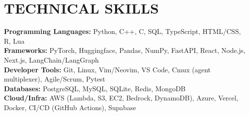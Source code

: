 \documentclass[letterpaper,11pt]{article}
\begin{document}
\section{\textbf{TECHNICAL SKILLS}}
 \begin{itemize}[leftmargin=0.15in, label={}, itemsep=-3pt, topsep=0pt]
    \small{\item{
     \textbf{Programming Languages:}{ Python, C++, C, SQL, TypeScript, HTML/CSS, R, Lua} \\
     \textbf{Frameworks:}{ PyTorch, Huggingface, Pandas, NumPy, FastAPI, React, Node.js, Next.js, LangChain/LangGraph} \\
     \textbf{Developer Tools:}{ Git, Linux, Vim/Neovim, VS Code, Cmux (agent multiplexer), Agile/Scrum, Pytest} \\
     \textbf{Databases:}{ PostgreSQL, MySQL, SQLite, Redis, MongoDB} \\
     \textbf{Cloud/Infra:}{ AWS (Lambda, S3, EC2, Bedrock, DynamoDB), Azure, Vercel, Docker, CI/CD (GitHub Actions), Supabase}
    }}
 \end{itemize}

\end{document}
